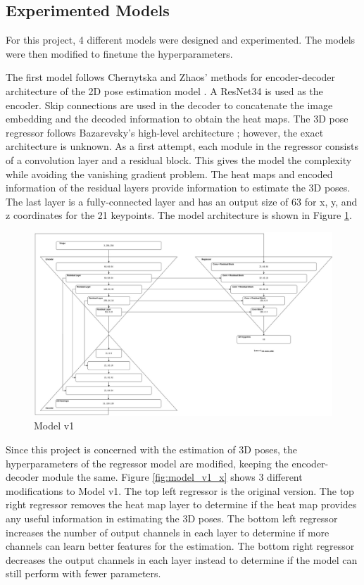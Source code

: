 \newpage
\subsection{Experimented Models}
\noindent
For this project, 4 different models were designed and experimented. The models were then modified to finetune the hyperparameters.

\noindent
The first model follows Chernytska and Zhaos' methods for encoder-decoder architecture of the 2D pose estimation model \cite{olha, semgcn}. A ResNet34 is used as the encoder. Skip connections are used in the decoder to concatenate the image embedding and the decoded information to obtain the heat maps. The 3D pose regressor follows Bazarevsky's high-level architecture \cite{blazepose}; however, the exact architecture is unknown. As a first attempt, each module in the regressor consists of a convolution layer and a residual block. This gives the model the complexity while avoiding the vanishing gradient problem. The heat maps and encoded information of the residual layers provide information to estimate the 3D poses. The last layer is a fully-connected layer and has an output size of 63 for x, y, and z coordinates for the 21 keypoints. The model architecture is shown in Figure \ref{fig:model_v1}.

\begin{figure}[ht]
	\begin{center}
		\includegraphics[width=450px]{assets/Model_v1.jpg}
		\caption{Model v1}
		\label{fig:model_v1}
	\end{center}
\end{figure}

\newpage

\noindent
Since this project is concerned with the estimation of 3D poses, the hyperparameters of the regressor model are modified, keeping the encoder-decoder module the same. Figure \ref{fig:model_v1_x} shows 3 different modifications to Model v1. The top left regressor is the original version. The top right regressor removes the heat map layer to determine if the heat map provides any useful information in estimating the 3D poses. The bottom left regressor increases the number of output channels in each layer to determine if more channels can learn better features for the estimation. The bottom right regressor decreases the output channels in each layer instead to determine if the model can still perform with fewer parameters.


